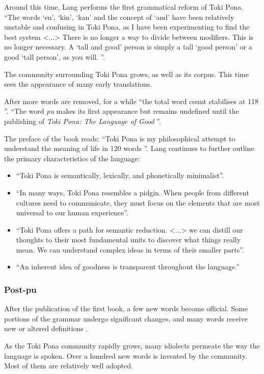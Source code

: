 \documentclass[14pt, a4paper]{extreport}
\begin{document}
Around this time, Lang performs the first grammatical reform of Toki Pona. ``The words `en', `kin', `kan' and the concept of `and' have been relatively unstable and confusing in Toki Pona, as I have been experimenting to find the best system <...> There is no longer a way to divide between modifiers. This is no longer necessary. A `tall and good' person is simply a tall `good person' or a good `tall person', as you will. \parencite{enkinkan}''.

The community surrounding Toki Pona grows, as well as its corpus. This time sees the appearance of many early translations.

After more words are removed, for a while ``the total word count stabilises at 118 \parencite{evo}''.  ``The word \textit{pu} makes its first appearance but remains undefined until the publishing of \textit{Toki Pona: The Language of Good} \parencite{evo}''.

The preface of the book reads: ``Toki Pona is my philosophical attempt to understand the meaning of life in 120 words \parencite{pu}''. Lang continues to further outline the primary characteristics of the language:

\begin{itemize}
  \item ``Toki Pona is semantically, lexically, and phonetically minimalist''.
  \item ``In many ways, Toki Pona resembles a pidgin. When people from different cultures need to communicate, they must focus on the elements that are most universal to our human experience''.
  \item ``Toki Pona offers a path for semantic reduction. <...> we can distill our thoughts to their most fundamental units to discover what things really mean. We can understand complex ideas in terms of their smaller parts''.
  \item ``An inherent idea of goodness is transparent throughout the language.''
\end{itemize}
      \subsubsection{Post-pu}
After the publication of the first book, a few new words become official. Some portions of the grammar undergo significant changes, and many words receive new or altered definitions \parencite{evo}.

As the Toki Pona community rapidly grows, many idiolects permeate the way the language is spoken. Over a hundred new words is invented by the community. Most of them are relatively well adopted.
\end{document}

